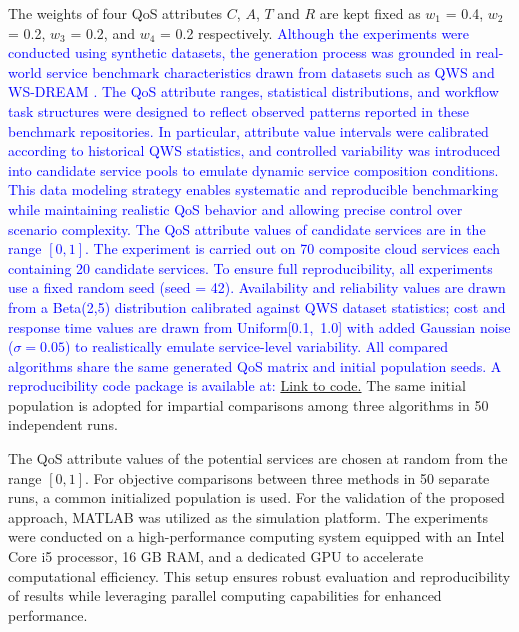 \documentclass[3p,twocolumn]{elsarticle}
\theoremstyle{thmstyleone}%
\theoremstyle{thmstyletwo}%
\theoremstyle{thmstylethree}%
\begin{document}
The weights of four QoS attributes $C$, $A$, $T$ and $R$ are kept fixed as $w_1$ = 0.4, $w_2$ = 0.2, $w_3$ = 0.2, and $w_4$ = 0.2 respectively. \textcolor{blue}{Although the experiments were conducted using synthetic datasets, the generation process was grounded in real-world service benchmark characteristics drawn from datasets such as QWS \cite{arasteh2024quality} and WS-DREAM 
\cite{du2017deeplog}. The QoS attribute ranges, statistical distributions, and workflow task structures were designed to reflect observed patterns reported in these benchmark repositories. In 
particular, attribute value intervals were calibrated according to historical QWS statistics, and controlled variability was introduced into candidate service pools to emulate dynamic service composition conditions. This data modeling strategy enables systematic and reproducible benchmarking while maintaining realistic QoS behavior and allowing precise control over scenario complexity. The QoS attribute values of candidate services are in the range $[0, 1]$. The experiment is carried out on 70 composite cloud services each containing 20 candidate services. To ensure full reproducibility, all experiments use a fixed random seed (seed = 42). Availability and reliability values are drawn from a Beta(2,5) distribution calibrated against QWS dataset statistics; cost and response time values are drawn from Uniform[0.1,~1.0] with added Gaussian noise ($\sigma = 0.05$) to realistically emulate service-level variability. All compared algorithms share the same generated QoS matrix and initial population seeds. A reproducibility code package is available 
at: \textcolor{magenta}{\href{https://drive.google.com/file/d/1CL6aNZ02KGt86NJB4NGUT6ES_5jlZmrR/view?usp=drive_link}{Link to code.}}} The same initial population is adopted for impartial comparisons 
among three algorithms in 50 independent runs.

The QoS attribute values of the potential services are chosen at random from the range $[0, 1]$. For objective comparisons between three methods in 50 separate runs, a common initialized population is used. For the validation of the proposed approach, MATLAB was utilized as the simulation platform. The experiments were conducted on a high-performance computing system equipped with an Intel Core i5 processor, 16 GB RAM, and a dedicated GPU to accelerate computational efficiency. This setup ensures robust evaluation and reproducibility of results while leveraging parallel computing capabilities for enhanced performance.
\end{document}
